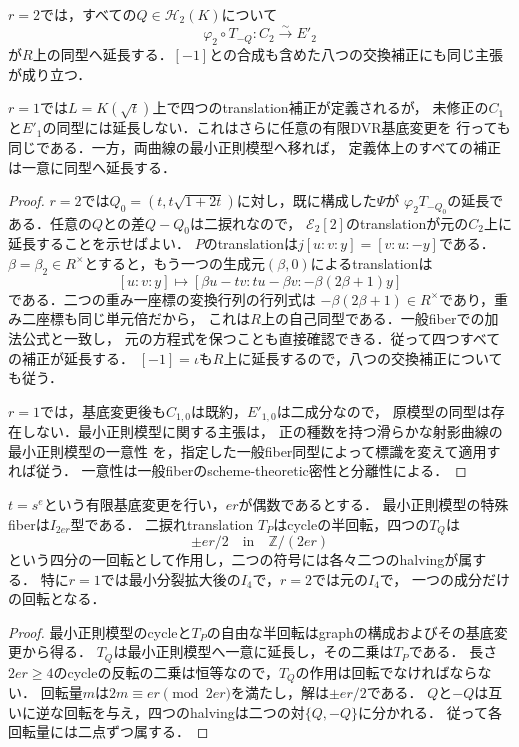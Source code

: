 \begin{proposition}[四つの補正の模型への延長]
\label{prop:qa-boundary-halves-model-extension}
$r=2$では，すべての$Q\in\mathcal H_2(K)$について
\[
 \varphi_2\circ T_{-Q}:C_2\xrightarrow{\sim}E'_2
\]
が$R$上の同型へ延長する．$[-1]$との合成も含めた八つの交換補正にも同じ主張が成り立つ．

$r=1$では$L=K(\sqrt t)$上で四つのtranslation補正が定義されるが，
未修正の$C_1$と$E'_1$の同型には延長しない．これはさらに任意の有限DVR基底変更を
行っても同じである．一方，両曲線の最小正則模型へ移れば，
定義体上のすべての補正は一意に同型へ延長する．
\end{proposition}
\begin{proof}
$r=2$では$Q_0=(t,t\sqrt{1+2t})$に対し，既に構成した$\Psi$が
$\varphi_2T_{-Q_0}$の延長である．任意の$Q$との差$Q-Q_0$は二捩れなので，
$\mathcal E_2[2]$のtranslationが元の$C_2$上に延長することを示せばよい．
$P$のtranslationは$j[u:v:y]=[v:u:-y]$である．
$\beta=\beta_2\in R^\times$とすると，もう一つの生成元$(\beta,0)$によるtranslationは
\[
 [u:v:y]\longmapsto
 [\beta u-tv:tu-\beta v:-\beta(2\beta+1)y]
\]
である．二つの重み一座標の変換行列の行列式は
$-\beta(2\beta+1)\in R^\times$であり，重み二座標も同じ単元倍だから，
これは$R$上の自己同型である．一般fiberでの加法公式と一致し，
元の方程式を保つことも直接確認できる．従って四つすべての補正が延長する．
$[-1]=\iota$も$R$上に延長するので，八つの交換補正についても従う．

$r=1$では，基底変更後も$C_{1,0}$は既約，$E'_{1,0}$は二成分なので，
原模型の同型は存在しない．最小正則模型に関する主張は，
正の種数を持つ滑らかな射影曲線の最小正則模型の一意性
\cite[Lemma~55.10.1, Tag~0C6B]{StacksMinimalModels}
を，指定した一般fiber同型によって標識を変えて適用すれば従う．
一意性は一般fiberのscheme-theoretic密性と分離性による．
\end{proof}

\begin{corollary}[成分cycle上の四分の一回転]
\label{cor:qa-boundary-halves-component-rotation}
$t=s^e$という有限基底変更を行い，$er$が偶数であるとする．
最小正則模型の特殊fiberは$I_{2er}$型である．
二捩れtranslation $T_P$はcycleの半回転，四つの$T_Q$は
\[
 \pm er/2\quad\text{in}\quad\mathbb Z/(2er)
\]
という四分の一回転として作用し，二つの符号には各々二つのhalvingが属する．
特に$r=1$では最小分裂拡大後の$I_4$で，$r=2$では元の$I_4$で，
一つの成分だけの回転となる．
\end{corollary}
\begin{proof}
最小正則模型のcycleと$T_P$の自由な半回転はgraphの構成およびその基底変更から得る．
$T_Q$は最小正則模型へ一意に延長し，その二乗は$T_P$である．
長さ$2er\ge4$のcycleの反転の二乗は恒等なので，$T_Q$の作用は回転でなければならない．
回転量$m$は$2m\equiv er\pmod{2er}$を満たし，解は$\pm er/2$である．
$Q$と$-Q$は互いに逆な回転を与え，四つのhalvingは二つの対$\{Q,-Q\}$に分かれる．
従って各回転量には二点ずつ属する．
\end{proof}


